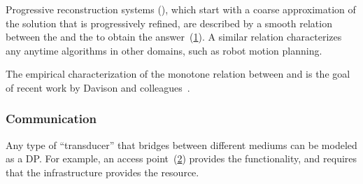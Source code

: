 \begin{example}
    Progressive reconstruction systems (\cite{locher16progressive}), which start with a coarse approximation of the solution that is progressively refined, are described by a smooth relation between the  and the  to obtain the answer~(\cref{fig:progressive}).
    A similar relation characterizes any anytime algorithms in other domains, such as robot motion planning.
\end{example}

\begin{figure}[h!]
    \centering
    \caption{}
    \label{fig:progressive}
\end{figure}

\begin{example}
    The empirical characterization of the monotone relation between  and  is the goal of recent work by Davison and colleagues~\cite{nardi15introducing,zia16comparative}.
\end{example}

\subsubsection{Communication}

\begin{example}[Transducers]
    Any type of ``transducer'' that bridges between different mediums can be modeled as a DP.
    For example, an access point~(\cref{fig:accesspoint}) provides the  functionality, and requires that the infrastructure provides the  resource.
\end{example}


\begin{figure}[h!]
    \centering
    \caption{}
    \label{fig:accesspoint}
\end{figure}

